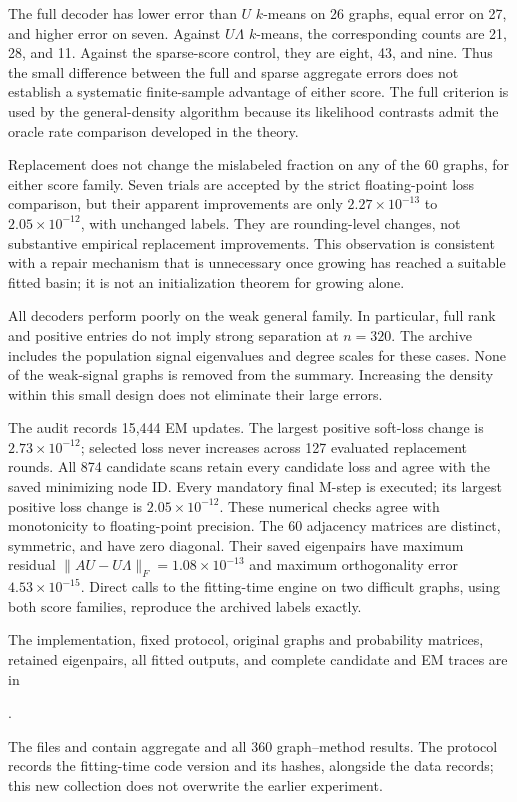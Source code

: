\documentclass[11pt]{article}
\theoremstyle{definition}
\theoremstyle{remark}
\numberwithin{equation}{section}
\begin{document}
The full decoder has lower error than $U$ $k$-means on 26 graphs, equal
error on 27, and higher error on seven. Against $U\Lambda$ $k$-means, the
corresponding counts are 21, 28, and 11. Against the sparse-score control,
they are eight, 43, and nine. Thus the small difference between the full and
sparse aggregate errors does not establish a systematic finite-sample
advantage of either score. The full criterion is used by the general-density
algorithm because its likelihood contrasts admit the oracle rate comparison developed in the theory.

Replacement does not change the mislabeled fraction on any of the 60
graphs, for either score family. Seven trials are accepted by the strict
floating-point loss comparison, but their apparent improvements are only
$2.27\times10^{-13}$ to $2.05\times10^{-12}$, with unchanged labels.
They are rounding-level changes, not substantive empirical replacement
improvements. This observation is consistent with a repair mechanism that
is unnecessary once growing has reached a suitable fitted basin; it is not
an initialization theorem for growing alone.

All decoders perform poorly on the weak general family. In particular,
full rank and positive entries do not imply strong separation at $n=320$.
The archive includes the population signal eigenvalues and degree scales
for these cases. None of the weak-signal graphs is removed from the summary.
Increasing the density within this small design does not eliminate their
large errors.

The audit records 15,444 EM updates. The largest positive soft-loss change
is $2.73\times10^{-12}$; selected loss never increases across 127 evaluated
replacement rounds. All 874 candidate scans retain every candidate loss
and agree with the saved minimizing node ID. Every mandatory final M-step
is executed; its largest positive loss change is $2.05\times10^{-12}$.
These numerical checks agree with monotonicity to floating-point precision.
The 60 adjacency matrices are distinct, symmetric, and have zero diagonal.
Their saved eigenpairs have maximum residual
$\|AU-U\Lambda\|_F=1.08\times10^{-13}$ and maximum orthogonality error
$4.53\times10^{-15}$. Direct calls to the fitting-time engine on two difficult
graphs, using both score families, reproduce the archived labels exactly.

The implementation, fixed protocol, original graphs and probability
matrices, retained eigenpairs, all fitted outputs, and complete candidate
and EM traces are in
\begin{center}
.
\end{center}
The files  and
 contain aggregate and all
360 graph--method results. The protocol records the fitting-time code version
and its hashes, alongside the data records; this new collection does not
overwrite the earlier experiment.
\end{document}
